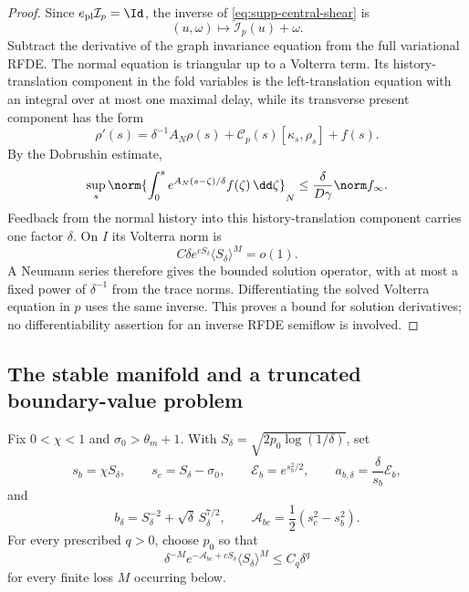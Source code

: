 \begin{proof}
Since \(e_{\rm pl}\mathcal I_p=\Id\), the inverse of
\cref{eq:supp-central-shear} is
\[
 (u,\omega)\longmapsto\mathcal I_p(u)+\omega.
\]
Subtract the derivative of the graph invariance equation from the full
variational RFDE.  The normal equation is triangular up to a Volterra
term.  Its history-translation component in the fold variables is the
left-translation equation with
an integral over at most one maximal delay, while its transverse present
component has the form
\begin{equation}
 \rho'(s)=\delta^{-1}A_N\rho(s)
          +\mathcal C_p(s)[\kappa_s,\rho_s]+f(s).
 \label{eq:supp-central-normal-equation}
\end{equation}
By the Dobrushin estimate,
\begin{equation}
 \sup_s\norm{\int_0^s
 e^{A_N(s-\zeta)/\delta}f(\zeta)\,\dd\zeta}_N
 \le\frac{\delta}{D\gamma}\norm f_\infty.
 \label{eq:supp-central-poisson}
\end{equation}
Feedback from the normal history into this history-translation component carries
one factor \(\delta\).  On \(I\) its Volterra norm is
\[
 C\delta e^{cS_\delta}\langle S_\delta\rangle^M=o(1).
\]
A Neumann series therefore gives the bounded solution operator, with at most a fixed
power of \(\delta^{-1}\) from the trace norms.  Differentiating the solved
Volterra equation in \(p\) uses the same inverse.  This proves a bound for
solution derivatives; no differentiability assertion for an inverse RFDE
semiflow is involved.
\end{proof}

\subsection{The stable manifold and a truncated boundary-value problem}

Fix \(0<\chi<1\) and \(\sigma_0>\theta_m+1\).  With
\(S_\delta=\sqrt{2p_0\log(1/\delta)}\), set
\begin{equation}
 s_b=\chi S_\delta,\qquad
 s_c=S_\delta-\sigma_0,\qquad
 \mathcal E_b=e^{s_b^2/2},\qquad
 a_{b,\delta}=\frac{\delta}{s_b}\mathcal E_b,
 \label{eq:supp-central-cuts}
\end{equation}
and
\begin{equation}
 b_\delta=S_\delta^{-2}+\sqrt\delta\,S_\delta^{7/2},
 \qquad
 \mathcal A_{bc}=\frac12(s_c^2-s_b^2).
 \label{eq:supp-central-overlap-scale}
\end{equation}
For every prescribed \(q>0\), choose \(p_0\) so that
\begin{equation}
 \delta^{-M}e^{-\mathcal A_{bc}+cS_\delta}
       \langle S_\delta\rangle^M\le C_q\delta^q
 \label{eq:supp-central-action-choice}
\end{equation}
for every finite loss \(M\) occurring below.

